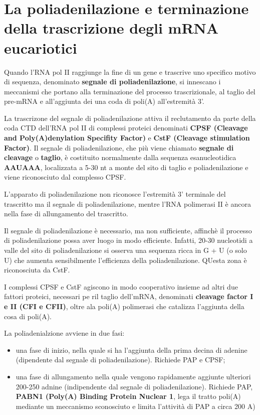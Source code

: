 \documentclass[11pt]{book}
\begin{document}
\section{La poliadenilazione e terminazione della trascrizione
degli mRNA
eucariotici}\label{la-poliadenilazione-e-terminazione-della-trascrizione-degli-mrna-eucariotici}

Quando l'RNA pol II raggiunge la fine di un gene e trascrive uno
specifico motivo di sequenza, denominato \textbf{segnale di
poliadenilazione}, si innescano i meccanismi che portano alla
terminazione del processo trascrizionale, al taglio del pre-mRNA e
all'aggiunta dei una coda di poli(A) all'estremità 3'.

La trascrizone del segnale di poliadenilazione attiva il reclutamento da
parte della coda CTD dell'RNA pol II di complessi proteici denominati
\textbf{CPSF (Cleavage and Poly(A)denylation Specifity Factor)} e
\textbf{CstF (Cleavage stimulation Factor)}. Il segnale di
poliadenilazione, che più viene chiamato \textbf{segnale di cleavage} o
\textbf{taglio}, è costituito normalmente dalla sequenza esanucleotidica
\textbf{AAUAAA}, localizzata a 5-30 nt a monte del sito di taglio e
poliadenilazione e viene riconosciuto dal complesso CPSF.

L'apparato di poliadenilazione non riconosce l'estremità 3' terminale
del trascritto ma il segnale di poliadenilazione, mentre l'RNA
polimerasi II è ancora nella fase di allungamento del trascritto.

Il segnale di poliadenilazione è necessario, ma non sufficiente,
affinchè il processo di poliadenilazione possa aver luogo in modo
efficiente. Infatti, 20-30 nucleotidi a valle del sito di
poliadenilazione si osserva una sequenza ricca in G + U (o solo U) che
aumenta sensibilmente l'efficienza della poliadenilazione. QUesta zona è
riconosciuta da CstF.

I complessi CPSF e CstF agiscono in modo cooperativo insieme ad altri
due fattori proteici, necessari pe ril taglio dell'mRNA, denominati
\textbf{cleavage factor I e II (CFI e CFII)}, oltre ala poli(A)
polimerasi che catalizza l'aggiunta della cosa di poli(A).

La poliadenialzione avviene in due fasi:

\begin{itemize}
\itemsep1pt\parskip0pt
\item
  una fase di inizio, nella quale si ha l'aggiunta della prima decina di
  adenine (dipendente dal segnale di poliadenilazione). Richiede PAP e
  CPSF;
\item
  una fase di allungamento nella quale vengono rapidamente aggiunte
  ulteriori 200-250 adnine (indipendente dal segnale di
  poliadenilazione). Richiede PAP, \textbf{PABN1 (Poly(A) Binding
  Protein Nuclear 1}, lega il tratto poli(A) mediante un meccanismo
  sconosciuto e limita l'attività di PAP a circa 200 A)
\end{itemize}
\end{document}
